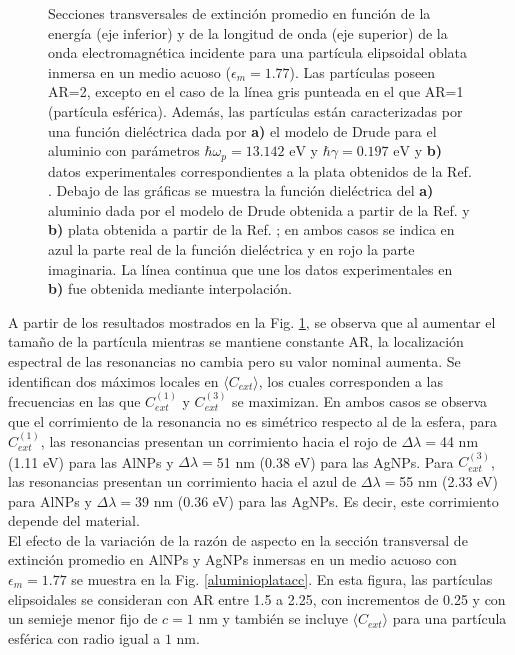 \begin{figure}[h!]
	\quad%
	\caption{Secciones transversales de extinción promedio en función de la energía (eje inferior) y de la longitud de onda (eje superior) de la onda electromagnética incidente para una partícula elipsoidal oblata inmersa en un medio acuoso ($\epsilon_m=1.77$).  Las partículas poseen AR=2, excepto en el caso de la línea gris punteada en el que AR=1 (partícula esférica). Además, las partículas están caracterizadas por una función dieléctrica dada por  \textbf{a)} el modelo de Drude para el aluminio con parámetros $\hbar\omega_p=13.142\text{ eV}$ y $\hbar\gamma=0.197\text{ eV}$ \cite{Aluminio} y \textbf{b)} datos experimentales correspondientes a la plata obtenidos de la Ref. \cite{Plata}. Debajo de las gráficas se muestra la función dieléctrica del \textbf{a)} aluminio dada por el modelo de Drude obtenida a partir de la Ref. \cite{Aluminio} y \textbf{b)} plata obtenida a partir de la Ref. \cite{Plata}; en ambos casos se indica en azul la parte real de la función dieléctrica y en rojo la parte imaginaria. La línea continua que une los datos experimentales en \textbf{b)} fue obtenida mediante interpolación.}\label{aluminioplataAR}
\end{figure}
A partir de los resultados mostrados en la Fig. \ref{aluminioplataAR}, se observa que al aumentar el tamaño de la partícula mientras se mantiene constante AR, la localización espectral de las resonancias no cambia pero su valor nominal aumenta. Se identifican dos máximos locales en $\langle C_{ext}\rangle$,  los cuales corresponden a las frecuencias en las que $C_{ext}^{(1)}$ y $C_{ext}^{(3)}$ se maximizan. En ambos casos se observa que el corrimiento  de la resonancia no es simétrico respecto al de la esfera, para $C_{ext}^{(1)}$, las resonancias presentan un corrimiento hacia el rojo de $\Delta\lambda=$44 nm (1.11 eV) para las AlNPs y $\Delta\lambda=$51 nm (0.38 eV) para las AgNPs. Para $C_{ext}^{(3)}$, las resonancias presentan un corrimiento hacia el azul de $\Delta\lambda=$55 nm (2.33 eV) para AlNPs y $\Delta\lambda=$39 nm (0.36 eV) para las AgNPs. Es decir, este corrimiento depende del material. \\

El efecto de la variación de la razón de aspecto en la sección transversal de extinción promedio en AlNPs y AgNPs inmersas en un medio acuoso con $\epsilon_m=1.77$ se muestra en la Fig. \ref{aluminioplatacc}. En esta figura, las partículas elipsoidales se consideran con AR entre 1.5 a 2.25, con incrementos de 0.25 y con un semieje menor fijo de $c=1\text{ nm}$ y también se incluye $\langle C_{ext}\rangle$ para una partícula esférica con radio igual a $1\text{ nm}$.\\


